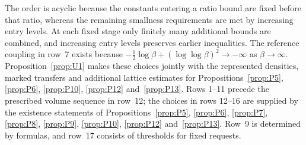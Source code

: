 The order is acyclic because the constants entering a ratio bound are fixed before that ratio, whereas the remaining smallness requirements are met by increasing entry levels. At each fixed stage only finitely many additional bounds are combined, and increasing entry levels preserves earlier inequalities. The reference coupling in row~7 exists because $-\tfrac12\log\beta+(\log\log\beta)^2\to-\infty$ as $\beta\to\infty$. Proposition~\ref{prop:U1} makes these choices jointly with the represented densities, marked transfers and additional lattice estimates for Propositions~\ref{prop:P5}, \ref{prop:P6}, \ref{prop:P10}, \ref{prop:P12} and~\ref{prop:P13}. Rows 1--11 precede the prescribed volume sequence in row~12; the choices in rows 12--16 are supplied by the existence statements of Propositions~\ref{prop:P5}, \ref{prop:P6}, \ref{prop:P7}, \ref{prop:P8}, \ref{prop:P9}, \ref{prop:P10}, \ref{prop:P12} and~\ref{prop:P13}. Row~9 is determined by formulas, and row~17 consists of thresholds for fixed requests.
